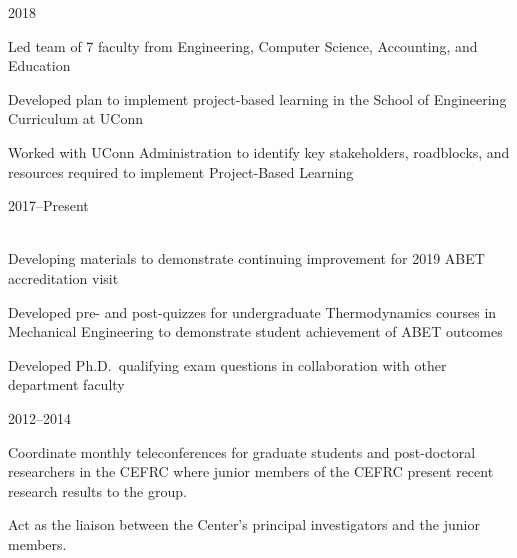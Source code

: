 \begin{lonelist}
\item[]  \hfill 2018\\

\begin{innerlist}
    \item Led team of 7 faculty from Engineering, Computer Science, Accounting, and Education
    \item Developed plan to implement project-based learning in the School of Engineering Curriculum at UConn
    \item Worked with UConn Administration to identify key stakeholders, roadblocks, and resources required to implement Project-Based Learning
\end{innerlist}

\item[]  \hfill 2017--Present\\
\\

\begin{innerlist}
    \item Developing materials to demonstrate continuing improvement for 2019 ABET accreditation visit
    \item Developed pre- and post-quizzes for undergraduate Thermodynamics courses in Mechanical Engineering to demonstrate student achievement of ABET outcomes
    \item Developed Ph.D.\ qualifying exam questions in collaboration with other department faculty
\end{innerlist}

\item[]  \hfill 2012--2014\\

\begin{innerlist}
\item Coordinate monthly teleconferences for graduate students
and post-doctoral researchers in the CEFRC where junior members of
the CEFRC present recent research results to the group.
\item Act as the liaison between the Center's principal investigators
and the junior members.
\end{innerlist}


\end{lonelist}
